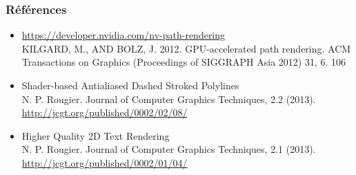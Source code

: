
\begin{frame}
  \frametitle{Références}
  \begin{itemize}
  \item \url{https://developer.nvidia.com/nv-path-rendering} \\
    KILGARD, M., AND BOLZ, J. 2012. GPU-accelerated path rendering. ACM Transactions on Graphics
    (Proceedings of SIGGRAPH Asia 2012) 31, 6. 106
  \item Shader-based Antialiased Dashed Stroked Polylines \\
    N. P. Rougier. Journal of Computer Graphics Techniques, 2.2 (2013). \\
    \url{http://jcgt.org/published/0002/02/08/}
  \item Higher Quality 2D Text Rendering \\
    N. P. Rougier. Journal of Computer Graphics Techniques, 2.1 (2013). \\
    \url{http://jcgt.org/published/0002/01/04/}
  \end{itemize}
\end{frame}

